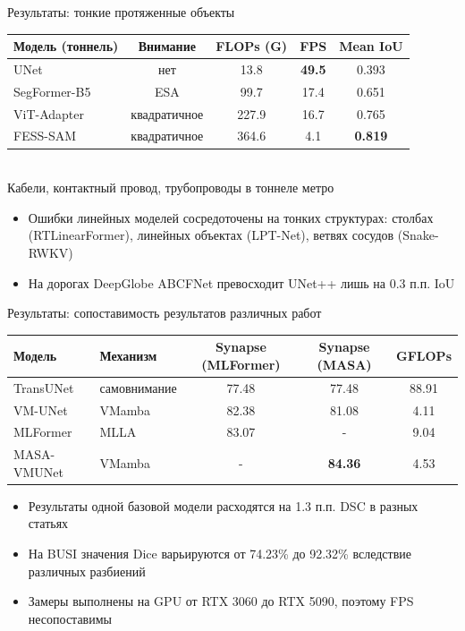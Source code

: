 \documentclass[10pt,aspectratio=169]{beamer}
\newcommand{\down}{\textcolor{red!70!black}}
\begin{document}
\begin{frame}{Результаты: тонкие протяженные объекты}
  \centering
  \footnotesize
  \begin{tabular}{lcccc}
    \toprule
    Модель (тоннель) & Внимание & FLOPs (G) & FPS & Mean IoU \\
    \midrule
    UNet & нет & 13.8 & \textbf{49.5} & 0.393 \\
    SegFormer-B5 & ESA & 99.7 & 17.4 & 0.651 \\
    ViT-Adapter & квадратичное & 227.9 & 16.7 & 0.765 \\
    FESS-SAM & квадратичное & 364.6 & 4.1 & \textbf{0.819} \\
    \bottomrule
  \end{tabular}\\[2pt]
  {\scriptsize Кабели, контактный провод, трубопроводы в тоннеле метро \cite{fesssam}}
  \vspace{0.3cm}
  \begin{itemize}
    \item Ошибки линейных моделей сосредоточены на тонких структурах: столбах (RTLinearFormer), линейных объектах (LPT-Net), ветвях сосудов (Snake-RWKV)
    \item На дорогах DeepGlobe ABCFNet превосходит UNet++ лишь на 0.3 п.п. IoU
  \end{itemize}
\end{frame}

\begin{frame}{Результаты: сопоставимость результатов различных работ}
  \centering
  \footnotesize
  \begin{tabular}{llccc}
    \toprule
    Модель & Механизм & Synapse (MLFormer) & Synapse (MASA) & GFLOPs \\
    \midrule
    TransUNet & самовнимание & 77.48 & 77.48 & 88.91 \\
    VM-UNet & VMamba & \down{82.38} & \down{81.08} & 4.11 \\
    MLFormer & MLLA & 83.07 & - & 9.04 \\
    MASA-VMUNet & VMamba & - & \textbf{84.36} & 4.53 \\
    \bottomrule
  \end{tabular}
  \vspace{0.4cm}
  \begin{itemize}
    \item Результаты одной базовой модели расходятся на 1.3 п.п. DSC в разных статьях
    \item На BUSI значения Dice варьируются от 74.23\% до 92.32\% вследствие различных разбиений
    \item Замеры выполнены на GPU от RTX 3060 до RTX 5090, поэтому FPS несопоставимы
  \end{itemize}
\end{frame}
\end{document}
